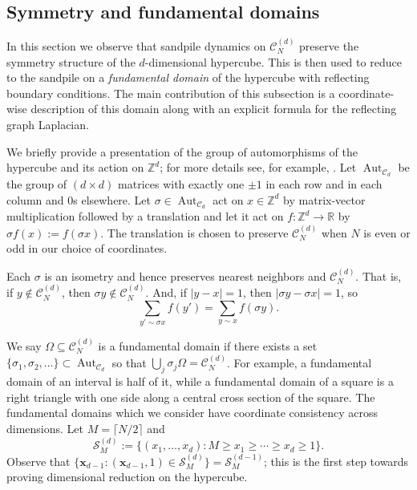 \documentclass[12pt]{amsart}
\newcommand{\Z}{\mathbb{Z}}
\begin{document}
	\subsection{Symmetry and fundamental domains} \label{subsec:symmetry}
	In this section we observe that sandpile dynamics on $\mathcal{C}_N^{(d)}$ preserve the symmetry structure of the $d$-dimensional hypercube.
	This is then used to reduce to the sandpile on a {\it fundamental domain} of the hypercube with reflecting boundary conditions.  The main contribution 
	of this subsection is a coordinate-wise description of this domain along with an explicit formula for the reflecting graph Laplacian. 
	
	We briefly provide a presentation of the group of automorphisms of the hypercube
	and its action on $\Z^d$; for more details see, for example, \cite{godsil2013algebraic}. 
	Let $\operatorname{Aut}_{\mathcal{C}_d}$ be the group of $(d \times d)$ matrices 
	with exactly one $\pm 1$ in each row and in each column and $0$s elsewhere. 
	Let $\sigma \in \operatorname{Aut}_{\mathcal{C}_d}$ act on $x \in \Z^d$ by matrix-vector multiplication
	followed by a translation and let it act on $f:\Z^d \to \mathbb{R}$ by $\sigma f(x) := f(\sigma x)$. 
	The translation is chosen to preserve $\mathcal{C}_{N}^{(d)}$ when $N$ is even or odd in our choice of coordinates. 

	
	Each $\sigma$ is an isometry and hence preserves nearest neighbors and $\mathcal{C}^{(d)}_N$. 
	That is, if $y \not \in \mathcal{C}^{(d)}_{N}$, then $\sigma y \not \in \mathcal{C}^{(d)}_{N}$.
	And, if $|y-x| = 1$, then $|\sigma y - \sigma x| = 1$, so 
	\begin{equation} \label{eq:isometry}
	\sum_{y' \sim \sigma x} f(y') = \sum_{y \sim x} f(\sigma y).
	\end{equation}
	
	
	We say $\Omega \subseteq \mathcal{C}_{N}^{(d)}$ is a fundamental domain if there exists a set $\{\sigma_1, \sigma_2, \ldots \}  \subset  \operatorname{Aut}_{\mathcal{C}_d}$ so that $\bigcup_j \sigma_j \Omega = \mathcal{C}_{N}^{(d)}$. For example, a fundamental domain of an interval is half of it, 
	while a fundamental domain of a square is a right triangle with one side along a central cross section of the square. The fundamental domains which we consider have coordinate consistency across dimensions.  Let $M = \lceil N/2 \rceil$ and 
	\begin{equation}
	\mathcal{S}^{(d)}_M := \{ (x_1, \ldots, x_d): M \geq x_1 \geq \cdots \geq x_d \geq 1 \}.
	\end{equation}
	Observe that  $\{ \mathbf{x}_{d-1} : (\mathbf{x}_{d-1}, 1) \in \mathcal{S}^{(d)}_M\} = \mathcal{S}^{(d-1)}_M$;
	this is the first step towards proving dimensional reduction on the hypercube. 
	
\end{document}
